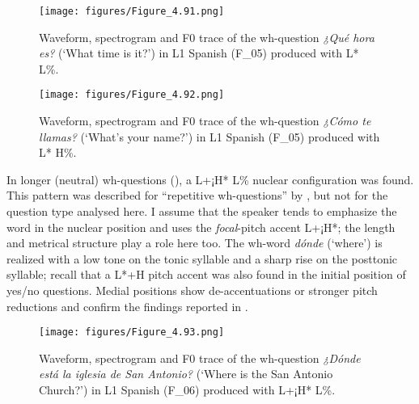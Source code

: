 \begin{figure}


\texttt{[image: figures/Figure\_4.91.png]}



\caption{Waveform, spectrogram and F0 trace of the wh-question \textit{¿Qué hora es?} (‘What time is it?’) in L1 Spanish (F\_05) produced with L* L\%.}
\label{fig:4.91}
\end{figure}

\begin{figure}


\texttt{[image: figures/Figure\_4.92.png]}



\caption{Waveform, spectrogram and F0 trace of the wh-question \textit{¿Cómo te llamas?} (‘What’s your name?’) in L1 Spanish (F\_05) produced with L* H\%.}
\label{fig:4.92}
\end{figure}

In longer (neutral) wh-questions (), a L+¡H* L\% nuclear configuration was found. This pattern was described for “repetitive wh-questions” by \citet{Escandell-Vidal1998}, but not for the question type analysed here. I assume that the speaker tends to emphasize the word in the nuclear position and uses the \textit{focal}{}-pitch accent L+¡H*; the length and metrical structure play a role here too. The wh-word \textit{dónde} (‘where’) is realized with a low tone on the tonic syllable and a sharp rise on the posttonic syllable; recall that a L*+H pitch accent was also found in the initial position of yes/no questions. Medial positions show de-accentuations or stronger pitch reductions and confirm the findings reported in \citet{TorreiraEtAl2012}.

\begin{figure}


\texttt{[image: figures/Figure\_4.93.png]}


\caption{Waveform, spectrogram and F0 trace of the wh-question \textit{¿Dónde está la iglesia de San Antonio?} (‘Where is the San Antonio Church?’) in L1 Spanish (F\_06) produced with L+¡H* L\%.}
\label{fig:4.93}
\end{figure}

